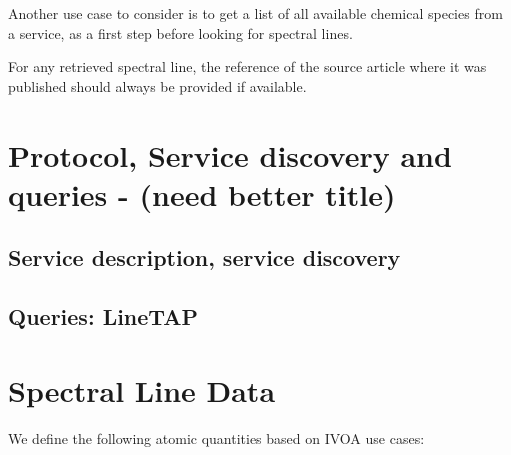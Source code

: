 \documentclass[11pt,a4paper]{ivoa}
\begin{document}
Another use case to consider is to get a list of all available chemical species 
from a service, as a first step before looking for spectral lines.

For any retrieved spectral line, the reference of the source article where it was published
should always be provided if available.

\section{Protocol, Service discovery and queries - (need better title)}

\subsection{ Service description, service discovery }

\subsection{ Queries: LineTAP }


\section{Spectral Line Data}\label{quantities}

We define the following atomic quantities based on IVOA use cases:
\end{document}
